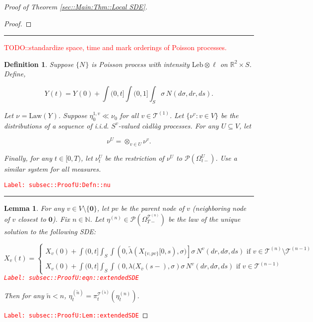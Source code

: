 \documentclass[12pt]{article}
\newcommand{\mb}{\mathbb}
\newcommand{\mc}{\mathcal}
\newcommand{\ov}{\overline}
\newcommand{\te}{\text}
\newcommand{\tr}{\textcolor{red}}
\newcommand{\labe}[1]{\tr{\texttt{Label: #1}}}
\newcommand{\lin}{\rule{\linewidth}{0.4 pt}}
\newcommand{\pmsr}{\mc{P}}							%
\renewcommand{\root}{\mathbf{0}}				%
\renewcommand{\v}{v}							%
\renewcommand{\U}{U}							%
\renewcommand{\S}{S}							%
\newcommand{\s}{\sigma}							%
\newcommand{\T}{T}								%
\renewcommand{\t}{t}							%
\newcommand{\sset}{\Omega}						%
\newcommand{\proj}{\pi}							%
\renewcommand{\tt}{s}							%
\newcommand{\X}{X}								%
\newcommand{\vind}[1]{^{#1}}					%
\newcommand{\carp}[1]{^{#1}}					%
\newcommand{\vsi}[1]{^{#1}}						%
\newcommand{\cind}[1]{_{#1}}					%
\newcommand{\cl}{\ov}							%
\newcommand{\tp}[1]{(#1)}						%
\newcommand{\tip}[1]{#1}						%
\newcommand{\ts}[1]{_{#1}}						%
\newcommand{\slnvind}[2]{^{#1,#2}}				%
\newcommand{\tree}{\mc{T}}						%
\newcommand{\sln}[1]{^{(#1)}}					%
\newcommand{\poiss}{N}							%
\newcommand{\leb}{\te{Leb}}						%
\newcommand{\Sm}{\ell}							%
\newcommand{\rate}{\lambda}						%
\renewcommand{\r}{r}							%
\newcommand{\alt}[1]{\widetilde{#1}}			%
\newcommand{\mm}{\nu}							%
\newcommand{\mmm}{\eta}							%
\newcommand{\law}{\te{Law}}						%
\newcommand{\XX}{Y}								%
\newcommand{\crate}{\alt{\lambda}}				%
\newcommand{\p}{p}								%
\newtheorem{lem}[thms]{Lemma}
\newtheorem{defn}[thms]{Definition}
\begin{document}
\begin{proof}[Proof of Theorem \ref{sec::Main:Thm::Local SDE}]
\begin{proof}
\end{proof}

\lin

\tr{TODO::standardize space, time and mark orderings of Poisson processes.}

\begin{defn}
Suppose \(\{\poiss\vind{}\}\) is Poisson process with intensity \(\leb\otimes \Sm\) on \(\mb{R}^2\times \S\). Define,

\[\XX\cind{}\tp{\t} = \XX\cind{}\tp{0} + \int{(0,\t]}\int{(0,1]}\int_\S\s\,\poiss\vind{}(d\s,d\r,d\tt).\]

Let \(\mm\vind{}\ts{} = \law(\XX\cind{}\tip{})\). Suppose \(\mmm\slnvind{1}{\v}\ts{0}\ll\mm\vind{}\ts{0}\) for all \(\v\in\tree\sln{1}\). Let \(\{\mm\vind{\v}\ts{}:\v\in V\}\) be the distributions of a sequence of i.i.d. \(\S\carp{\v}\)-valued c\`adl\`ag processes. For any \(\U\subseteq V\), let 

\[\mm\vind{\U}\ts{} = \otimes_{\v\in\U} \mm\vind{\v}\ts{}.\]

Finally, for any \(\t\in [0,\T)\), let \(\mm\vind{\U}\ts{\t}\) be the restriction of \(\mm\vind{\U}\ts{}\) to \(\pmsr(\sset\vsi{\U}\ts{\t-})\). Use a similar system for all measures.
\label{subsec::ProofU:Defn::nu}
\end{defn}
\labe{subsec::ProofU:Defn::nu}

\lin

\begin{lem}
For any \(\v \in V\setminus\{\root\}\), let \(\p{\v}\) be the parent node of \(\v\) (neighboring node of \(\v\) closest to \(\root\)). Fix \(n \in \mb{N}\). Let \(\mmm\sln{n}\ts{} \in \pmsr\left(\sset\vsi{\tree\sln{n}}\ts{\T-}\right)\) be the law of the unique solution to the following SDE:

\begin{equation}
\X\cind{\v}\tp{\t} = \begin{cases}
\X\cind{\v}\tp{0} + \int{(0,\t]}\int_\S\int{\left(0,\crate{}{}(\X\cind{\{\v,\p{\v}\}}\tip{[0,\tt)},\s)\right]}\s\,\poiss\vind{\v}(d\r,d\s,d\tt)\te{ if } \v \in \tree\sln{n}\setminus \tree\sln{n-1}\\
\X\cind{\v}\tp{0} + \int{(0,\t]}\int_\S\int{\left(0,\rate{}(\X\cind{\cl{\v}}\tp{\tt-},\s\right)}\s\,\poiss\vind{\v}(d\r,d\s,d\tt)\te{ if } \v \in \tree\sln{n-1}
\end{cases}
\label{subsec::ProofU:eqn::extendedSDE}
\end{equation}
\labe{subsec::ProofU:eqn::extendedSDE}

Then for any \(\alt{n} < n\), \(\mmm\sln{\alt{n}}\ts{\t} = \proj\vsi{\tree\sln{\alt{n}}}\ts{\t}(\mmm\sln{n}\ts{\t})\).
\label{subsec::ProofU:Lem::extendedSDE}
\end{lem}
\labe{subsec::ProofU:Lem::extendedSDE}


\end{proof}
\end{document}
